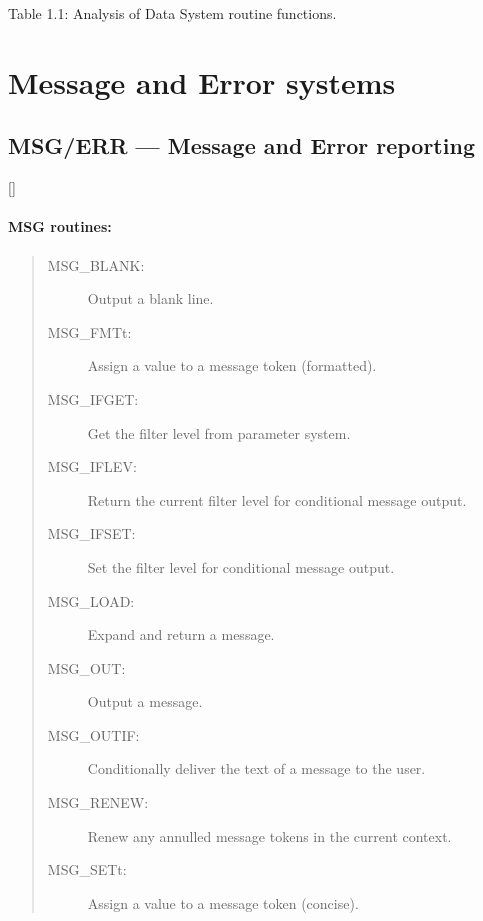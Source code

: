 \begin{center}
Table 1.1: Analysis of Data System routine functions.
\end{center}

\newpage

\section{Message and Error systems}
\label{R_ME}

\subsection{MSG/ERR --- Message and Error reporting}

\vspace{-9mm}

\hfill []

\vspace{2mm}

\paragraph{MSG routines:}

\begin{quote}
\begin{description}
\item [MSG\_BLANK:]  Output a blank line.
\item [MSG\_FMTt:]  Assign a value to a message token (formatted).
\item [MSG\_IFGET:]  Get the filter level from parameter system.
\item [MSG\_IFLEV:]  Return the current filter level for conditional message output.
\item [MSG\_IFSET:]  Set the filter level for conditional message output.
\item [MSG\_LOAD:]  Expand and return a message.
\item [MSG\_OUT:]  Output a message.
\item [MSG\_OUTIF:]  Conditionally deliver the text of a message to the user.
\item [MSG\_RENEW:]  Renew any annulled message tokens in the current context.
\item [MSG\_SETt:]  Assign a value to a message token (concise).
\end{description}
\end{quote}

\vspace*{10mm}

